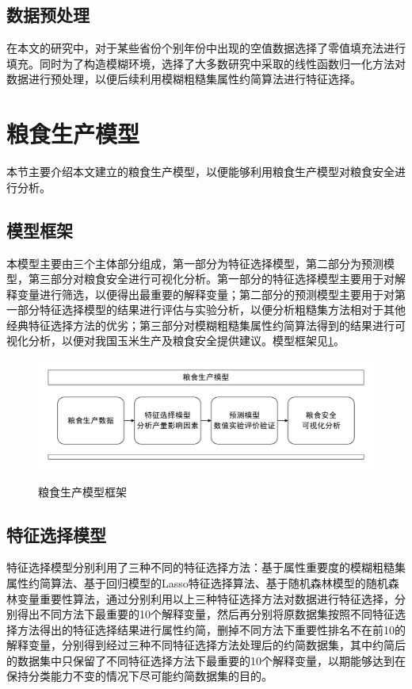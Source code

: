 
\subsection{数据预处理}
\label{subsection:DataCleaning}
在本文的研究中，对于某些省份个别年份中出现的空值数据选择了零值填充法进行填充。同时为了构造模糊环境，选择了大多数研究中采取的线性函数归一化方法对数据进行预处理\cite{BestOverview}，以便后续利用模糊粗糙集属性约简算法进行特征选择。
\section{粮食生产模型}
本节主要介绍本文建立的粮食生产模型，以便能够利用粮食生产模型对粮食安全进行分析。
\subsection{模型框架}
本模型主要由三个主体部分组成，第一部分为特征选择模型，第二部分为预测模型，第三部分对粮食安全进行可视化分析。第一部分的特征选择模型主要用于对解释变量进行筛选，以便得出最重要的解释变量；第二部分的预测模型主要用于对第一部分特征选择模型的结果进行评估与实验分析，以便分析粗糙集方法相对于其他经典特征选择方法的优劣；第三部分对模糊粗糙集属性约简算法得到的结果进行可视化分析，以便对我国玉米生产及粮食安全提供建议。模型框架见\ref{fig:FoodProductionModel}。


\begin{figure}[htbp]
  \centering
  \resizebox{\textwidth}{!}
  {
  \includegraphics{figs/FoodProductionModel}
  }
  \caption{粮食生产模型框架}
  \label{fig:FoodProductionModel}
\end{figure}


\subsection{特征选择模型}
特征选择模型分别利用了三种不同的特征选择方法：基于属性重要度的模糊粗糙集属性约简算法、基于回归模型的Lasso特征选择算法、基于随机森林模型的随机森林变量重要性算法，通过分别利用以上三种特征选择方法对数据进行特征选择，分别得出不同方法下最重要的10个解释变量，然后再分别将原数据集按照不同特征选择方法得出的特征选择结果进行属性约简，删掉不同方法下重要性排名不在前10的解释变量，分别得到经过三种不同特征选择方法处理后的约简数据集，其中约简后的数据集中只保留了不同特征选择方法下最重要的10个解释变量，以期能够达到在保持分类能力不变的情况下尽可能约简数据集的目的。

